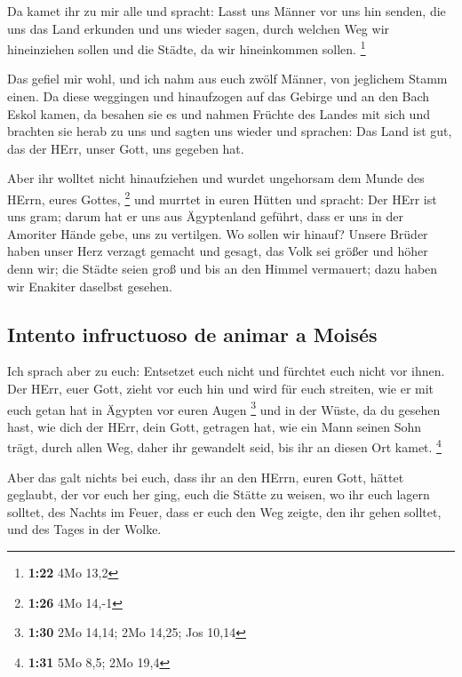  Da kamet ihr zu mir alle und spracht: Lasst uns Männer
vor uns hin senden, die uns das Land erkunden und uns wieder sagen,
durch welchen Weg wir hineinziehen sollen und die Städte, da wir
hineinkommen sollen. \footnote{\textbf{1:22} 4Mo 13,2}

 Das gefiel mir wohl, und ich nahm aus euch zwölf Männer,
von jeglichem Stamm einen.  Da diese weggingen und
hinaufzogen auf das Gebirge und an den Bach Eskol kamen, da besahen sie
es  und nahmen Früchte des Landes mit sich und brachten
sie herab zu uns und sagten uns wieder und sprachen: Das Land ist gut,
das der HErr, unser Gott, uns gegeben hat.

 Aber ihr wolltet nicht hinaufziehen und wurdet
ungehorsam dem Munde des HErrn, eures Gottes, \footnote{\textbf{1:26}
  4Mo 14,-1}  und murrtet in euren Hütten und spracht:
Der HErr ist uns gram; darum hat er uns aus Ägyptenland geführt, dass er
uns in der Amoriter Hände gebe, uns zu vertilgen.  Wo
sollen wir hinauf? Unsere Brüder haben unser Herz verzagt gemacht und
gesagt, das Volk sei größer und höher denn wir; die Städte seien groß
und bis an den Himmel vermauert; dazu haben wir Enakiter daselbst
gesehen.

\hypertarget{intento-infructuoso-de-animar-a-moisuxe9s}{%
\subsection{Intento infructuoso de animar a
Moisés}\label{intento-infructuoso-de-animar-a-moisuxe9s}}

 Ich sprach aber zu euch: Entsetzet euch nicht und
fürchtet euch nicht vor ihnen.  Der HErr, euer Gott,
zieht vor euch hin und wird für euch streiten, wie er mit euch getan hat
in Ägypten vor euren Augen \footnote{\textbf{1:30} 2Mo 14,14; 2Mo 14,25;
  Jos 10,14}  und in der Wüste, da du gesehen hast, wie
dich der HErr, dein Gott, getragen hat, wie ein Mann seinen Sohn trägt,
durch allen Weg, daher ihr gewandelt seid, bis ihr an diesen Ort kamet.
\footnote{\textbf{1:31} 5Mo 8,5; 2Mo 19,4}

 Aber das galt nichts bei euch, dass ihr an den HErrn,
euren Gott, hättet geglaubt,  der vor euch her ging, euch
die Stätte zu weisen, wo ihr euch lagern solltet, des Nachts im Feuer,
dass er euch den Weg zeigte, den ihr gehen solltet, und des Tages in der
Wolke.

